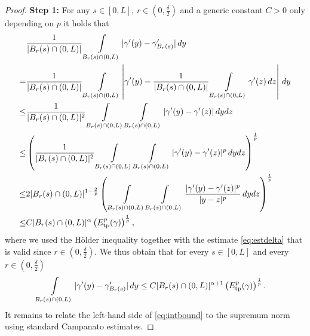 \documentclass{article}
\begin{document}
\begin{proof}
    \textbf{Step 1:}
    For any $s\in[0,L]$, $r\in(0,\frac \delta 2)$ and a generic constant $C>0$ only depending on $p$ it holds that 
    \begin{align*}
        &\frac{1}{| B_r(s) \cap (0,L) |} \int\limits_{B_r(s) \cap (0,L)}|\gamma'(y) - \gamma'_{B_r(s)}|  \, dy \\
        =& \frac{1}{| B_r(s) \cap (0,L) |} \int\limits_{B_r(s) \cap (0,L)}\left|\gamma'(y) - \frac{1}{| B_r(s) \cap (0,L) |}\int\limits_{B_r(s) \cap (0,L)} \gamma'(z) \, dz \right| \, dy\\
        \leq& \frac{1}{| B_r(s) \cap (0,L) |^2} \int\limits_{B_r(s) \cap (0,L)} \int\limits_{B_r(s) \cap (0,L)} |\gamma'(y) - \gamma'(z) | \, dy dz\\
        \leq& \left( \frac{1}{| B_r(s) \cap (0,L) |^2} \int\limits_{B_r(s) \cap (0,L)} \int\limits_{B_r(s) \cap (0,L)} |\gamma'(y) - \gamma'(z) |^p \, dy dz \right)^{\frac{1}{p}}\\
        \leq& 2| B_r(s) \cap (0,L) |^{1-\frac{2}{p}} \left(\, \int\limits_{B_r(s) \cap (0,L)} \int\limits_{B_r(s) \cap (0,L)} \frac{ |\gamma'(y) - \gamma'(z) |^p}{|y-z|^p} \, dy dz \right)^{\frac{1}{p}}\\
        \leq& C| B_r(s) \cap (0,L) |^{\alpha} \left(E_{\rm tp}^p(\gamma)\right)^{\frac{1}{p}},
    \end{align*}
    where we used the Hölder inequality together with the estimate \eqref{eq:estdelta} that is valid since $r\in(0,\frac \delta 2)$. 
    We thus obtain that for every $s\in [0,L]$ and every $r\in(0,\frac \delta 2)$
    \begin{align}\label{eq:intbound}
        \int\limits_{B_r(s) \cap (0,L)}|\gamma'(y) - \gamma'_{B_r(s)}|  \, dy &\leq C| B_r(s) \cap (0,L) |^{\alpha+1} \left(E_{\rm tp}^p(\gamma)\right)^{\frac{1}{p}}.
    \end{align}
    It remains to relate the left-hand side of \eqref{eq:intbound} to the supremum norm using standard Campanato estimates. 


\end{proof}
\end{document}

